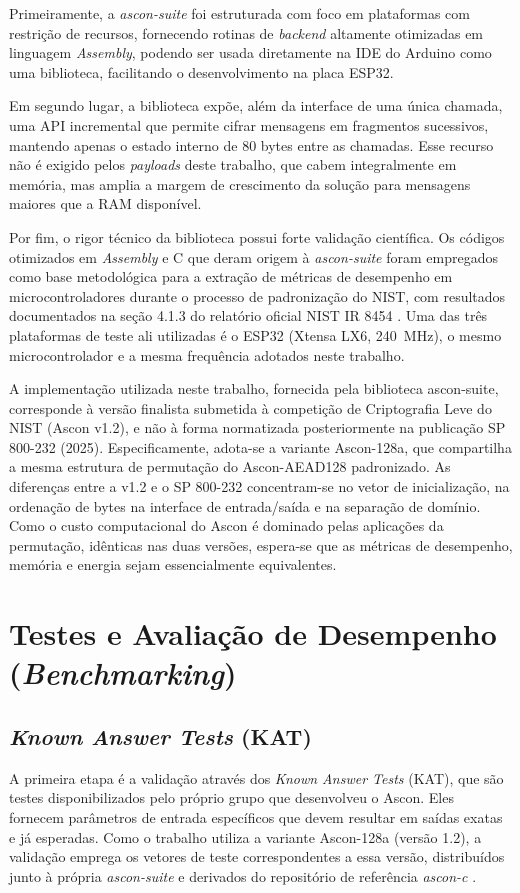 Primeiramente, a \textit{ascon-suite} foi estruturada com foco em plataformas com restrição de recursos, fornecendo rotinas de \textit{backend} altamente otimizadas em linguagem \textit{Assembly}, podendo ser usada diretamente na IDE do Arduino como uma biblioteca, facilitando o desenvolvimento na placa ESP32.

Em segundo lugar, a biblioteca expõe, além da interface de uma única chamada, uma API incremental que permite cifrar mensagens em fragmentos sucessivos, mantendo apenas o estado interno de 80 bytes entre as chamadas. Esse recurso não é exigido pelos \textit{payloads} deste trabalho, que cabem integralmente em memória, mas amplia a margem de crescimento da solução para mensagens maiores que a RAM disponível.

Por fim, o rigor técnico da biblioteca possui forte validação científica. Os códigos otimizados em \textit{Assembly} e C que deram origem à \textit{ascon-suite} foram empregados como base metodológica para a extração de métricas de desempenho em microcontroladores durante o processo de padronização do NIST, com resultados documentados na seção 4.1.3 do relatório oficial NIST IR 8454 \cite{nistir8454}. Uma das três plataformas de teste ali utilizadas é o ESP32 (Xtensa LX6, 240~MHz), o mesmo microcontrolador e a mesma frequência adotados neste trabalho.

A implementação utilizada neste trabalho, fornecida pela biblioteca ascon-suite, corresponde à versão finalista submetida à competição de Criptografia Leve do NIST (Ascon v1.2), e não à forma normatizada posteriormente na publicação SP 800-232 (2025). Especificamente, adota-se a variante Ascon-128a, que compartilha a mesma estrutura de permutação do Ascon-AEAD128 padronizado. As diferenças entre a v1.2 e o SP 800-232 concentram-se no vetor de inicialização, na ordenação de bytes na interface de entrada/saída e na separação de domínio. Como o custo computacional do Ascon é dominado pelas aplicações da permutação, idênticas nas duas versões, espera-se que as métricas de desempenho, memória e energia sejam essencialmente equivalentes.


\section{Testes e Avaliação de Desempenho (\textit{Benchmarking})}
\label{subsec:validacao-ascon}
\subsection{\textit{Known Answer Tests} (KAT)}
A primeira etapa é a validação através dos \textit{Known Answer Tests} (KAT), que são testes disponibilizados pelo próprio grupo que desenvolveu o Ascon. Eles fornecem parâmetros de entrada específicos que devem resultar em saídas exatas e já esperadas. Como o trabalho utiliza a variante Ascon-128a (versão 1.2), a validação emprega os vetores de teste correspondentes a essa versão, distribuídos junto à própria \textit{ascon-suite} e derivados do repositório de referência \textit{ascon-c} \cite{ascon_reference_c}.

